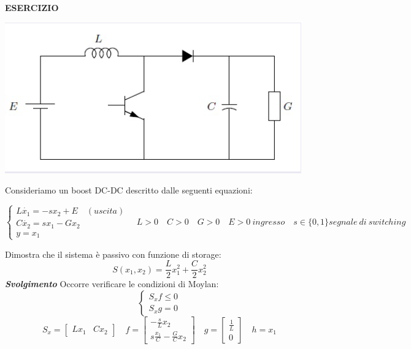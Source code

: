 \documentclass{book}
\begin{document}
\textbf{ESERCIZIO}
\begin{center}
    \includegraphics[scale=0.5]{DC-DCboost.png}
\end{center}
Consideriamo un boost DC-DC descritto dalle seguenti equazioni:
\begin{center}
    \begin{equation*}
        \begin{cases}
          L\dot{x_1}=-s x_2+E\quad (uscita)\\
        C\dot{x_2}=s x_1-G x_2 \\
        y=x_1
        \end{cases}\quad L>0\quad C>0\quad G>0\quad E>0\ ingresso\quad s\in\{0,1\} segnale\ di\ switching
    \end{equation*}
\end{center}
Dimostra che il sistema è passivo con funzione di storage:\begin{equation*}
    S(x_1,x_2)=\frac{L}{2}x_1^2+\frac{C}{2}x_2^2
\end{equation*}
\textbf{\emph{Svolgimento}}
Occorre verificare le condizioni di Moylan:\begin{equation*}
    \begin{cases}
      S_xf\leq0\\S_xg=0
    \end{cases}
\end{equation*}
\begin{equation*}
    S_x=\begin{bmatrix}
    Lx_1 & Cx_2
    \end{bmatrix}\quad
    f=\begin{bmatrix}
    -\frac{s}{L}x_2\\
    s\frac{x_1}{C}-\frac{G}{C}x_2
    \end{bmatrix}\quad
    g=
    \begin{bmatrix}
    \frac{1}{L}\\0
    \end{bmatrix}\quad h=x_1
\end{equation*}
\end{document}
